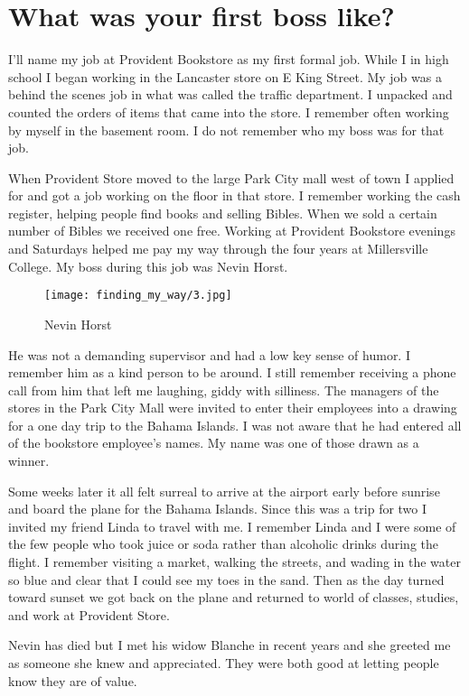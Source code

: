 \section{What was your first boss like?}
I'll name my job at Provident Bookstore as my first formal job.
While I in high school I began working in the Lancaster store on E King Street.
My job was a behind the scenes job in what was called the traffic department.
I unpacked and counted the orders of items that came into the store.
I remember often working by myself in the basement room.
I do not remember who my boss was for that job.

When Provident Store moved to the large Park City mall west of town I applied for and got a job working on the floor in that store.
I remember working the cash register, helping people find books and selling Bibles.
When we sold a certain number of Bibles we received one free.
Working at Provident Bookstore evenings and Saturdays helped me pay my way through the four years at Millersville College.
My boss during this job was Nevin Horst.
\begin{figure}
\centering
\texttt{[image: finding\_my\_way/3.jpg]}
\caption{
Nevin Horst
}
\end{figure}

He was not a demanding supervisor and had a low key sense of humor.
I remember him as a kind person to be around.
I still remember receiving a phone call from him that left me laughing, giddy with silliness.
The managers of the stores in the Park City Mall were invited to enter their employees into a drawing for a one day trip to the Bahama Islands.
I was not aware that he had entered all of the bookstore employee's names.
My name was one of those drawn as a winner.

Some weeks later it all felt surreal to arrive at the airport early before sunrise and board the plane for the Bahama Islands.
Since this was a trip for two I invited my friend Linda to travel with me.
I remember Linda and I were some of the few people who took juice or soda rather than alcoholic drinks during the flight.
I remember visiting a market, walking the streets, and wading in the water so blue and clear that I could see my toes in the sand.
Then as the day turned toward sunset we got back on the plane and returned to world of classes, studies, and work at Provident Store.

Nevin has died but I met his widow Blanche in recent years and she greeted me as someone she knew and appreciated.
They were both good at letting people know they are of value.

